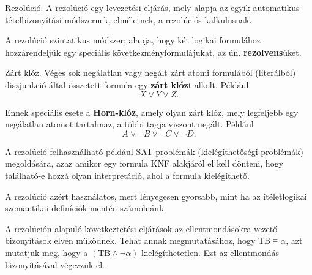 \begin{definicio}
    Rezolúció.
    A rezolúció egy levezetési eljárás, mely alapja az egyik automatikus
    tételbizonyítási módszernek, elméletnek, a rezolúciós kalkulusnak.

    A rezolúció szintatikus módszer; alapja, hogy két logikai formulához
    hozzárendeljük egy speciális következményformulájukat, az ún.
    {\bf rezolvens}üket.
\end{definicio}

\begin{definicio}
    Zárt klóz.  Véges sok negálatlan vagy negált zárt atomi formulából
    (literálból) diszjunkció által összetett formula egy {\bf zárt klóz}t
    alkolt. Például \[
        X \lor Y \lor Z
    .\]

    Ennek speciális esete a {\bf Horn-klóz}, amely olyan zárt klóz, mely
    legfeljebb egy negálatlan atomot tartalmaz, a többi tagja viszont negált.
    Például \[
        A \lor \lnot B \lor \lnot C \lor \lnot D
    .\]
\end{definicio}

\begin{megjegyzes}
    A rezolúció felhasználható például SAT-problémák (kielégíthetőségi
    problémák) megoldására, azaz amikor egy formula KNF alakjáról el kell
    dönteni, hogy található-e hozzá olyan interpretáció, ahol a formula
    kielégíthető.
\end{megjegyzes}

\begin{megjegyzes}
    A rezolúció azért használatos, mert lényegesen gyorsabb, mint ha az
    ítéletlogikai szemantikai definíciók mentén számolnánk.
\end{megjegyzes}

A rezolúción alapuló következtetési eljárások az ellentmondásokra vezető
bizonyítások elvén működnek. Tehát annak megmutatásához, hogy $\text{TB}
\models \alpha$, azt mutatjuk meg, hogy a $(\text{TB} \land \lnot \alpha)$
kielégíthetetlen. Ezt az ellentmondás bizonyításával végezzük el.

